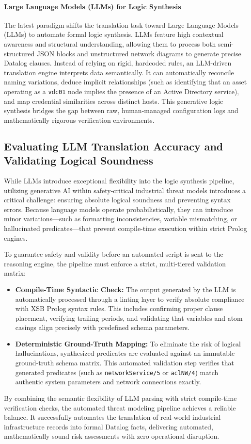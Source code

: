 \documentclass[target=mst,aauheader=aics,style=]{thud}
\begin{document}
\paragraph{Large Language Models (LLMs) for Logic Synthesis}
The latest paradigm shifts the translation task toward Large Language Models (LLMs) to automate formal logic synthesis. LLMs feature high contextual awareness and structural understanding, allowing them to process both semi-structured JSON blocks and unstructured network diagrams to generate precise Datalog clauses.
Instead of relying on rigid, hardcoded rules, an LLM-driven translation engine interprets data semantically. It can automatically reconcile naming variations, deduce implicit relationships (such as identifying that an asset operating as a \texttt{vdc01} node implies the presence of an Active Directory service), and map credential similarities across distinct hosts. This generative logic synthesis bridges the gap between raw, human-managed configuration logs and mathematically rigorous verification environments.

\subsection{Evaluating LLM Translation Accuracy and Validating Logical Soundness}
While LLMs introduce exceptional flexibility into the logic synthesis pipeline, utilizing generative AI within safety-critical industrial threat models introduces a critical challenge: ensuring absolute logical soundness and preventing syntax errors. Because language models operate probabilistically, they can introduce minor variations—such as formatting inconsistencies, variable mismatching, or hallucinated predicates—that prevent compile-time execution within strict Prolog engines.

To guarantee safety and validity before an automated script is sent to the reasoning engine, the pipeline must enforce a strict, multi-tiered validation matrix:
\begin{itemize}
    \item \textbf{Compile-Time Syntactic Check:} The output generated by the LLM is automatically processed through a linting layer to verify absolute compliance with XSB Prolog syntax rules. This includes confirming proper clause placement, verifying trailing periods, and validating that variables and atom casings align precisely with predefined schema parameters.
    \item \textbf{Deterministic Ground-Truth Mapping:} To eliminate the risk of logical hallucinations, synthesized predicates are evaluated against an immutable ground-truth schema matrix. This automated validation step verifies that generated predicates (such as \texttt{networkService/5} or \texttt{aclNW/4}) match authentic system parameters and network connections exactly.
\end{itemize}
By combining the semantic flexibility of LLM parsing with strict compile-time verification checks, the automated threat modeling pipeline achieves a reliable balance. It successfully automates the translation of real-world industrial infrastructure records into formal Datalog facts, delivering automated, mathematically sound risk assessments with zero operational disruption.
\end{document}
